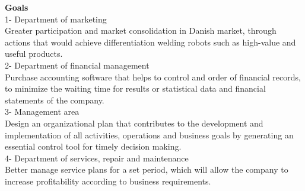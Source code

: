 \textbf{Goals}\\
1- Department of marketing\\
Greater participation and market consolidation in Danish market, through actions that would achieve differentiation welding robots such as high-value and useful products.\\
2- Department of financial management\\
Purchase accounting software that helps to control and order of financial records, to minimize the waiting time for results or statistical data and financial statements of the company.\\
3- Management area\\
Design an organizational plan that contributes to the development and implementation of all activities, operations and business goals by generating an essential control tool for timely decision making.\\
4- Department of services, repair and maintenance\\
Better manage service plans for a set period, which will allow the company to increase profitability according to business requirements.

